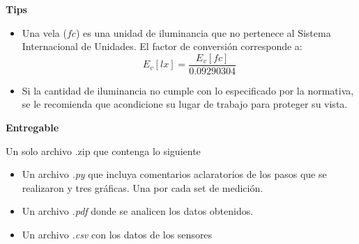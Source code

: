 \documentclass[12pt]{article}
\begin{document}
\noindent\textbf{Tips}

\begin{itemize}
    \item Una vela ($fc$) es una unidad de iluminancia que no pertenece al Sistema Internacional de Unidades. El factor de conversión corresponde a: 
    \begin{equation*}
        E_v[lx] = \frac{E_v[fc]}{0.09290304} 
    \end{equation*}
    \item Si la cantidad de iluminancia no cumple con lo especificado por la normativa, se le recomienda que acondicione su lugar de trabajo para proteger su vista.
\end{itemize}


\noindent\textbf{Entregable}

Un solo archivo .zip que contenga lo siguiente
\begin{itemize}
    \item Un archivo \emph{.py} que incluya comentarios aclaratorios de los pasos que se realizaron y tres gráficas. Una por cada set de medición.
    \item Un archivo \emph{.pdf} donde se analicen los datos obtenidos.
    \item Un archivo \emph{.csv} con los datos de los sensores
\end{itemize}

% 
% 
\end{document}
